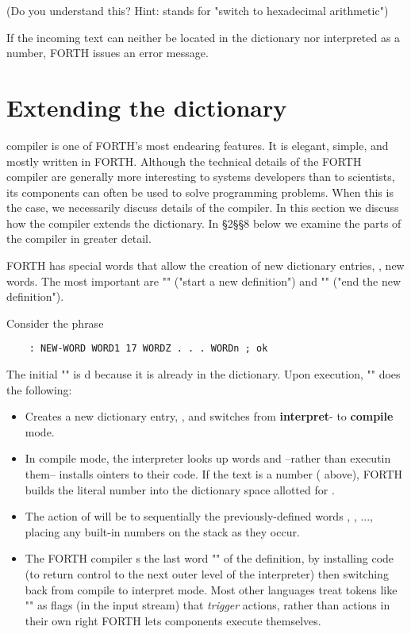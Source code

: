 (Do you understand this? Hint:  stands for "switch to hexadecimal arithmetic")

If the incoming text can neither be located in the dictionary nor interpreted as a number, FORTH issues an error message.


\section{Extending the dictionary}

 compiler is one of FORTH's most endearing features. It is elegant, simple, and mostly written in FORTH. Although the technical details of the FORTH compiler are generally more interesting to systems developers than to scientists, its components can often be used to solve programming problems. When this is the case, we necessarily discuss details of the compiler. In this section we discuss how the compiler extends the dictionary. In \S2\S\S8 below we examine the parts of the compiler in greater detail.

FORTH has special words that allow the creation of new dictionary entries, \ie, new words. The most important are "\bc{:}" ("start a new definition") and "\bc{;}" ("end the new definition").

Consider the phrase

\begin{lstlisting}
    : NEW-WORD WORD1 17 WORDZ . . . WORDn ; ok
\end{lstlisting}

The initial "\bc{:}" is d because it is already in the dictionary. Upon execution, "\bc{:}" does the following:

\begin{itemize}
    \item Creates a new dictionary entry, , and switches from \textbf{interpret}- to \textbf{compile} mode.
    \item In compile mode, the interpreter looks up words and --rather than executin them-- installs ointers to their code. If the text is a number ( above), FORTH builds the literal number into the dictionary space allotted for .
    \item The action of  will be to  sequentially the previously-defined words , , ..., placing any built-in numbers on the stack as they occur.
    \item The FORTH compiler s the last word "\bc{;}" of the definition, by installing code (to return control to the next outer level of the interpreter) then switching back from compile to interpret mode. Most other languages treat tokens like "\bc{;}" as ﬂags (in the input stream) that \textit{trigger} actions, rather than actions in their own right FORTH lets components execute themselves.
\end{itemize}

